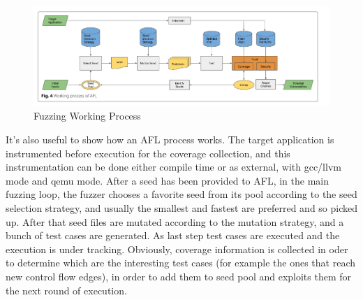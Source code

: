   \begin{figure}[tbh]
    \centering
    \includegraphics[width=1.0\linewidth]{images/fuzz-work.png}
    \caption[Fuzzing Working Process]{Fuzzing Working Process}
    \label{fig:fuzz-work}
  \end{figure}
  


It's also useful to show how an AFL process works.
The target application is instrumented before execution for the coverage collection, and this instrumentation can be done either compile time or as external, with gcc/llvm mode and qemu mode.
After a seed has been provided to AFL, in the main fuzzing loop, the fuzzer chooses a favorite seed from its pool according to the seed selection strategy,
and usually the smallest and fastest are preferred and so picked up. After that seed files are mutated according to the mutation strategy, and a bunch of test cases are generated.
As last step test cases are executed and the execution is under tracking. Obviously, coverage information is collected in oder to determine which are the interesting test cases (for example the ones that reach new control flow edges), 
in order to add them to seed pool and exploits them for the next round of execution.



